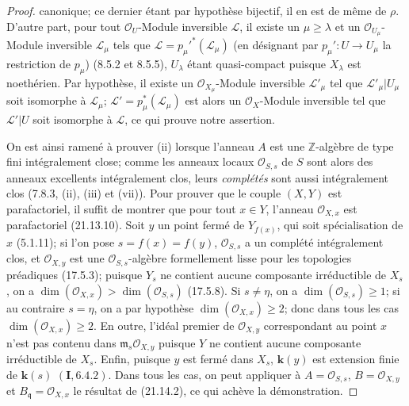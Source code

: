 \begin{proof}
canonique; ce dernier étant par hypothèse bijectif, il en est de même de $\rho$.
D'autre part, pour tout $\mathcal O_U$-Module inversible $\mathscr L$, il existe un
$\mu\geq\lambda$ et un $\mathcal O_{U_\mu}$-Module inversible $\mathscr L_\mu$ tels
que $\mathscr L=p_\mu'^*(\mathscr L_\mu)$ (en désignant par
$p_\mu':U\to U_\mu$ la restriction de $p_\mu$) (8.5.2 et 8.5.5), $U_\lambda$ étant
quasi-compact puisque $X_\lambda$ est noethérien. Par hypothèse, il existe un
$\mathcal O_{X_\mu}$-Module inversible $\mathscr L'_\mu$ tel que
$\mathscr L'_\mu|U_\mu$ soit isomorphe à $\mathscr L_\mu$;
$\mathscr L'=p_\mu^*(\mathscr L_\mu)$ est alors un $\mathcal O_X$-Module
inversible tel que $\mathscr L'|U$ soit isomorphe à $\mathscr L$, ce qui prouve notre
assertion.

On est ainsi ramené à prouver (ii) lorsque l'anneau $A$ est une
$\mathbb Z$-algèbre de type fini intégralement close; comme les anneaux locaux
$\mathcal O_{S,s}$ de $S$ sont alors des anneaux excellents intégralement clos, leurs
\emph{complétés} sont aussi intégralement clos (7.8.3, (ii), (iii) et (vii)). Pour
prouver que le couple $(X,Y)$ est parafactoriel, il suffit de montrer que pour tout
$x\in Y$, l'anneau $\mathcal O_{X,x}$ est parafactoriel (21.13.10). Soit $y$ un point
fermé de $Y_{f(x)}$, qui soit spécialisation de $x$ (5.1.11); si l'on pose
$s=f(x)=f(y)$, $\mathcal O_{S,s}$ a un
complété intégralement clos, et $\mathcal O_{X,y}$ est une
$\mathcal O_{S,s}$-algèbre formellement lisse pour les topologies préadiques
(17.5.3); puisque $Y_s$ ne contient aucune composante irréductible de $X_s$, on a
$\dim(\mathcal O_{X,x})>\dim(\mathcal O_{S,s})$ (17.5.8). Si $s\neq\eta$, on a
$\dim(\mathcal O_{S,s})\geq1$; si au contraire $s=\eta$, on a par hypothèse
$\dim(\mathcal O_{X,x})\geq2$; donc dans tous les cas
$\dim(\mathcal O_{X,x})\geq2$. En outre, l'idéal premier de $\mathcal O_{X,y}$
correspondant au point $x$ n'est pas contenu dans
$\mathfrak m_s\mathcal O_{X,y}$ puisque $Y$ ne contient aucune composante
irréductible de $X_s$. Enfin, puisque $y$ est fermé dans $X_s$, $\boldsymbol{k}(y)$ est extension
finie de $\boldsymbol{k}(s)$ $(\mathbf I, 6.4.2)$. Dans tous les cas, on peut appliquer à
$A=\mathcal O_{S,s}$, $B=\mathcal O_{X,y}$ et
$B_\mathfrak q=\mathcal O_{X,x}$ le résultat de (21.14.2), ce qui achève la
démonstration.
\end{proof}

